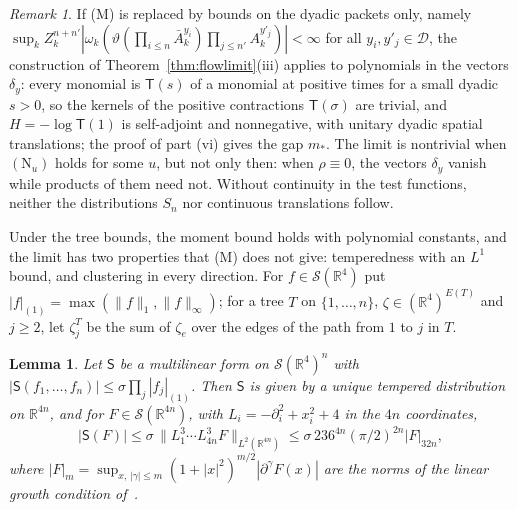 \documentclass[aps,prd,twocolumn,superscriptaddress,nofootinbib,longbibliography,floatfix,amsmath,amssymb,10pt]{revtex4-2}
\newtheorem{lemma}[theorem]{Lemma}
\theoremstyle{definition}
\theoremstyle{remark}
\newtheorem{remark}[theorem]{Remark}
\newcommand{\R}{\mathbb{R}}
\begin{document}
\begin{remark}\label{rem:dyadicmoments}
If (M) is replaced by bounds on the dyadic packets only, namely
$\sup_kZ_k^{n+n'}|\omega_k(\vartheta(\prod_{i\le n}\bar A^{y_i}_k)
\prod_{j\le n'}A^{y'_j}_k)|<\infty$ for all $y_i,y'_j\in\mathcal D$, the
construction of Theorem~\ref{thm:flowlimit}(iii) applies to polynomials in
the vectors $\delta_y$: every monomial is $\mathsf T(s)$ of a monomial at
positive times for a small dyadic $s>0$, so the kernels of the positive
contractions $\mathsf T(\sigma)$ are trivial, and $H=-\log\mathsf T(1)$ is
self-adjoint and nonnegative, with unitary dyadic spatial translations; the
proof of part (vi) gives the gap $m_*$. The limit is nontrivial when
$(\mathrm N_u)$ holds for some $u$, but not only then: when $\rho\equiv0$,
the vectors $\delta_y$ vanish while products of them need not. Without
continuity in the test functions, neither the distributions $S_n$ nor
continuous translations follow.
\end{remark}

Under the tree bounds, the moment bound holds with polynomial constants,
and the limit has two properties that (M) does not give: temperedness with
an $L^1$ bound, and clustering in every direction. For $f\in\mathcal
S(\R^4)$ put $|f|_{(1)}=\max(\|f\|_1,\|f\|_\infty)$; for a tree $T$ on
$\{1,\dots,n\}$, $\zeta\in(\R^4)^{E(T)}$ and $j\ge2$, let $\zeta^T_j$ be the
sum of $\zeta_e$ over the edges of the path from $1$ to $j$ in $T$.

\begin{lemma}\label{lem:hermite}
Let $\mathsf S$ be a multilinear form on $\mathcal S(\R^4)^n$ with
$|\mathsf S(f_1,\dots,f_n)|\le\sigma\prod_j|f_j|_{(1)}$. Then $\mathsf S$ is
given by a unique tempered distribution on $\R^{4n}$, and for $F\in\mathcal
S(\R^{4n})$, with $L_i=-\partial_i^2+x_i^2+4$ in the $4n$ coordinates,
\[
|\mathsf S(F)|\le\sigma\,\|L_1^3\cdots L_{4n}^3F\|_{L^2(\R^{4n})}
\le\sigma\,236^{4n}(\pi/2)^{2n}|F|_{32n},
\]
where $|F|_m=\sup_{x,\,|\gamma|\le m}(1+|x|^2)^{m/2}|\partial^\gamma F(x)|$
are the norms of the linear growth condition of~\cite{OS75}.
\end{lemma}
\end{document}
